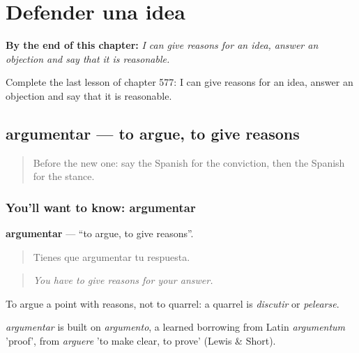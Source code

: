 
\chapter{Defender una idea}
\label{ch:es-defender-una-idea}

\begin{chapteropening}
\textbf{By the end of this chapter:} \emph{I can give reasons for an idea, answer an objection and say that it is reasonable.}

Complete the last lesson of chapter 577: I can give reasons for an idea, answer an objection and say that it is reasonable.
\end{chapteropening}

\section[argumentar]{argumentar — to argue, to give reasons}

\label{lesson:ES-C577-argumentar}



\begin{quote}
Before the new one: say the Spanish for the conviction, then the Spanish for the stance.
\end{quote}

\subsection*{You'll want to know: argumentar}
\textbf{argumentar} — \textquotedblleft{}to argue, to give reasons\textquotedblright{}.

\begin{quote}
Tienes que argumentar tu respuesta.
\end{quote}

\begin{quote}
\emph{You have to give reasons for your answer.}
\end{quote}

To argue a point with reasons, not to quarrel: a quarrel is \emph{discutir} or \emph{pelearse}.

\begin{cousinweb}
\emph{argumentar} is built on \emph{argumento}, a learned borrowing from Latin \emph{argumentum} 'proof', from \emph{arguere} 'to make clear, to prove' (Lewis \& Short).
\end{cousinweb}

